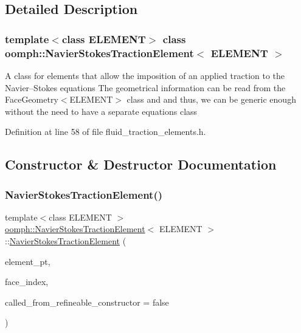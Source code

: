 \subsection{Detailed Description}
\subsubsection*{template$<$class E\+L\+E\+M\+E\+NT$>$\newline
class oomph\+::\+Navier\+Stokes\+Traction\+Element$<$ E\+L\+E\+M\+E\+N\+T $>$}

A class for elements that allow the imposition of an applied traction to the Navier--Stokes equations The geometrical information can be read from the Face\+Geometry$<$\+E\+L\+E\+M\+E\+N\+T$>$ class and and thus, we can be generic enough without the need to have a separate equations class 

Definition at line 58 of file fluid\+\_\+traction\+\_\+elements.\+h.



\subsection{Constructor \& Destructor Documentation}
\mbox{\label{classoomph_1_1NavierStokesTractionElement_af7905c7123e02a63ed41b4c7c2ad468d}} 
\subsubsection{\texorpdfstring{Navier\+Stokes\+Traction\+Element()}{NavierStokesTractionElement()}}
{\footnotesize\ttfamily template$<$class E\+L\+E\+M\+E\+NT $>$ \\
\hyperlink{classoomph_1_1NavierStokesTractionElement}{oomph\+::\+Navier\+Stokes\+Traction\+Element}$<$ E\+L\+E\+M\+E\+NT $>$\+::\hyperlink{classoomph_1_1NavierStokesTractionElement}{Navier\+Stokes\+Traction\+Element} (\begin{DoxyParamCaption}\item[{\hyperlink{classoomph_1_1FiniteElement}{Finite\+Element} $\ast$const \&}]{element\+\_\+pt,  }\item[{const int \&}]{face\+\_\+index,  }\item[{const bool \&}]{called\+\_\+from\+\_\+refineable\+\_\+constructor = {\ttfamily false} }\end{DoxyParamCaption})\hspace{0.3cm}{\ttfamily [inline]}}

